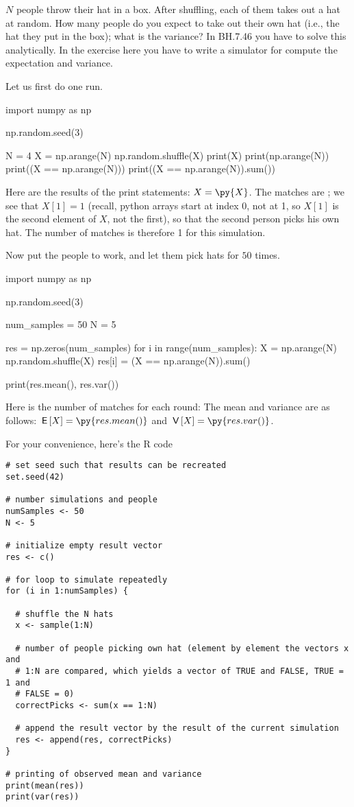\begin{exercise}
$N$ people throw their hat in a box. After shuffling, each of them takes out a hat at random. How many people do you expect to take out their own hat (i.e., the hat they put in the box); what is the variance? In BH.7.46 you have to solve this analytically. In the exercise here you have to write a simulator for compute the expectation and variance.
\begin{solution}
Let us first do one run.
\begin{pyblock}[][numbers=left,frame=lines]
import numpy as np

np.random.seed(3)

N = 4
X = np.arange(N)
np.random.shuffle(X)
print(X)
print(np.arange(N))
print((X == np.arange(N)))
print((X == np.arange(N)).sum())
\end{pyblock}
Here are the results of the print statements: $X = \py{X}$. The matches are ; we see that $X[1] = 1$ (recall, python arrays start at index 0, not at 1, so $X[1]$ is the second element of $X$, not the first), so that the second person picks his own hat. The number of matches is therefore 1 for this simulation.

Now put the people to work, and let them pick hats for $50$ times.
\begin{pyblock}[][numbers=left,frame=lines]
import numpy as np

np.random.seed(3)

num_samples = 50
N = 5

res = np.zeros(num_samples)
for i in range(num_samples):
    X = np.arange(N)
    np.random.shuffle(X)
    res[i] = (X == np.arange(N)).sum()

print(res.mean(), res.var())
\end{pyblock}
Here is the number of matches for each round: 
The mean and variance are as follows: $\E X = \py{res.mean()}$ and $\V X = \py{res.var()}$.

For your convenience, here's the R code
\begin{verbatim}
# set seed such that results can be recreated
set.seed(42)

# number simulations and people
numSamples <- 50
N <- 5

# initialize empty result vector
res <- c()

# for loop to simulate repeatedly
for (i in 1:numSamples) {

  # shuffle the N hats
  x <- sample(1:N)

  # number of people picking own hat (element by element the vectors x and
  # 1:N are compared, which yields a vector of TRUE and FALSE, TRUE = 1 and
  # FALSE = 0)
  correctPicks <- sum(x == 1:N)

  # append the result vector by the result of the current simulation
  res <- append(res, correctPicks)
}

# printing of observed mean and variance
print(mean(res))
print(var(res))
\end{verbatim}

\end{solution}
\end{exercise}



